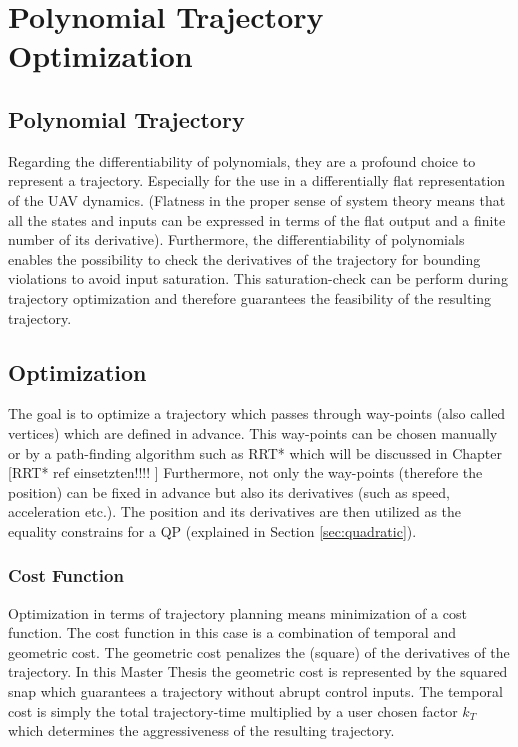 \chapter{Polynomial Trajectory Optimization}\label{sec:trajectory}


\section{Polynomial Trajectory}\label{sec:polynomial}

Regarding the differentiability of polynomials, they are a profound choice to represent a trajectory. Especially for the use in a differentially flat representation of the UAV dynamics. (Flatness in the proper sense of system theory means that all the states and inputs can be expressed in terms of the flat output and a finite number of its derivative). \newline
Furthermore, the differentiability of polynomials enables the possibility to check the derivatives of the trajectory for bounding violations to avoid input saturation. This saturation-check can be perform during trajectory optimization and therefore guarantees the feasibility of the resulting trajectory.

\section{Optimization}\label{sec:optimization}

The goal is to optimize a trajectory which passes through way-points (also called vertices) which are defined in advance. This way-points can be chosen manually or by a path-finding algorithm such as RRT* which will be discussed in Chapter [RRT*  ref einsetzten!!!! ] \newline
Furthermore, not only the way-points (therefore the position) can be fixed in advance but also its derivatives (such as speed, acceleration etc.). The position and its derivatives are then utilized as the equality constrains for a QP (explained in Section \ref{sec:quadratic}).

\subsection{Cost Function}\label{sec:cost}

Optimization in terms of trajectory planning means minimization of a cost function. The cost function in this case is a combination of temporal and geometric cost. The geometric cost penalizes the (square) of the derivatives of the trajectory. In this Master Thesis the geometric cost is represented by the squared snap which guarantees a trajectory without abrupt  control inputs. \newline
The temporal cost is simply the total trajectory-time multiplied by a user chosen factor $k_T$ which determines the aggressiveness of the resulting trajectory. \newline

